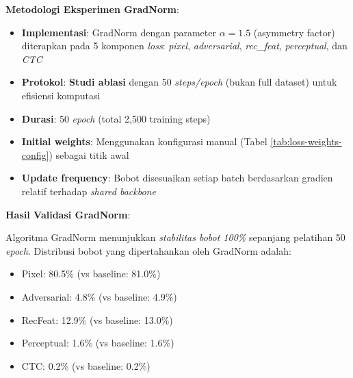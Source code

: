 \documentclass[12pt,a4paper]{article}
\begin{document}
\textbf{Metodologi Eksperimen GradNorm}:
\begin{itemize}[leftmargin=*]
    \item \textbf{Implementasi}: GradNorm dengan parameter $\alpha=1.5$ (asymmetry factor) diterapkan pada 5 komponen \textit{loss}: \textit{pixel}, \textit{adversarial}, \textit{rec\_feat}, \textit{perceptual}, dan \textit{CTC}
    \item \textbf{Protokol}: \textbf{Studi ablasi} dengan 50 \textit{steps/epoch} (bukan full dataset) untuk efisiensi komputasi
    \item \textbf{Durasi}: 50 \textit{epoch} (total 2,500 training steps)
    \item \textbf{Initial weights}: Menggunakan konfigurasi manual (Tabel \ref{tab:loss-weights-config}) sebagai titik awal
    \item \textbf{Update frequency}: Bobot disesuaikan setiap batch berdasarkan gradien relatif terhadap \textit{shared backbone}
\end{itemize}

\textbf{Hasil Validasi GradNorm}:

Algoritma GradNorm menunjukkan \textit{stabilitas bobot 100\%} sepanjang pelatihan 50 \textit{epoch}. Distribusi bobot yang dipertahankan oleh GradNorm adalah:
\begin{itemize}[leftmargin=*]
    \item Pixel: 80.5\% (vs baseline: 81.0\%)
    \item Adversarial: 4.8\% (vs baseline: 4.9\%)
    \item RecFeat: 12.9\% (vs baseline: 13.0\%)
    \item Perceptual: 1.6\% (vs baseline: 1.6\%)
    \item CTC: 0.2\% (vs baseline: 0.2\%)
\end{itemize}
\end{document}
